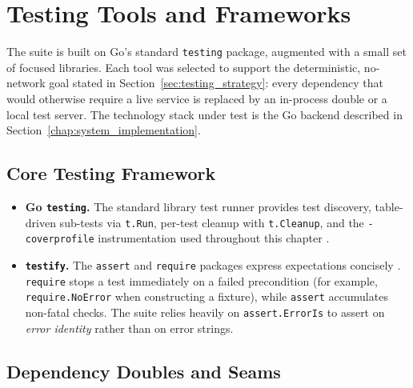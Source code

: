 \section{Testing Tools and Frameworks}
\label{sec:testing_tools}

The suite is built on Go's standard \texttt{testing} package, augmented with a small set of focused libraries. Each tool was selected to support the deterministic, no-network goal stated in Section~\ref{sec:testing_strategy}: every dependency that would otherwise require a live service is replaced by an in-process double or a local test server. The technology stack under test is the Go backend described in Section~\ref{chap:system_implementation}.

\subsection{Core Testing Framework}

\begin{itemize}
    \item \textbf{Go \texttt{testing}.} The standard library test runner provides test discovery, table-driven sub-tests via \texttt{t.Run}, per-test cleanup with \texttt{t.Cleanup}, and the \texttt{-coverprofile} instrumentation used throughout this chapter \cite{go_testing}.
    \item \textbf{\texttt{testify}.} The \texttt{assert} and \texttt{require} packages express expectations concisely \cite{testify}. \texttt{require} stops a test immediately on a failed precondition (for example, \texttt{require.NoError} when constructing a fixture), while \texttt{assert} accumulates non-fatal checks. The suite relies heavily on \texttt{assert.ErrorIs} to assert on \emph{error identity} rather than on error strings.
\end{itemize}

\subsection{Dependency Doubles and Seams}

